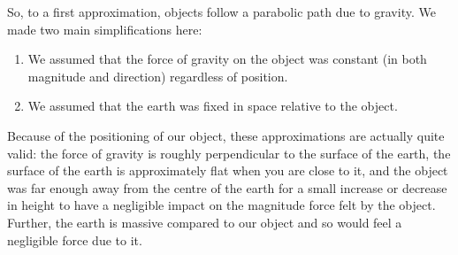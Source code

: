 \documentclass[a4paper,leqno,9pt]{article}
\theoremstyle{exercise}
\theoremstyle{plain}
\theoremstyle{definition}
\theoremstyle{remark}
\begin{document}
So, to a first approximation, objects follow a parabolic path due to gravity. We made two main simplifications here:
\begin{enumerate}
  \item We assumed that the force of gravity on the object was constant (in both magnitude and direction) regardless of position.
  \item We assumed that the earth was fixed in space relative to the object.
\end{enumerate}

Because of the positioning of our object, these approximations are actually quite valid: the force of gravity
is roughly perpendicular to the surface of the earth, the surface of the earth is approximately flat when you are close
to it, and the object was far enough away from the centre of the earth for a small increase or decrease in height
to have a negligible impact on the magnitude force felt by the object. Further, the earth is massive compared to our
object and so would feel a negligible force due to it.
\end{document}
